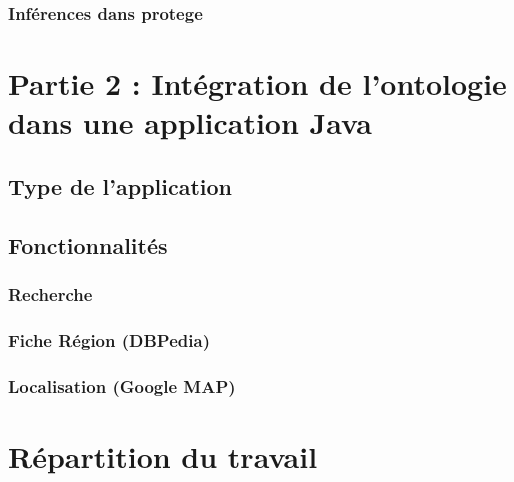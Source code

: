 \documentclass{article}
\begin{document}
\subsubsection{Inférences dans protege}

\section{Partie 2 : Intégration de l'ontologie dans une application Java}

\subsection{Type de l'application}

\subsection{Fonctionnalités}

\subsubsection{Recherche}

\subsubsection{Fiche Région (DBPedia)}

\subsubsection{Localisation (Google MAP)}

\section{Répartition du travail}
\end{document}
